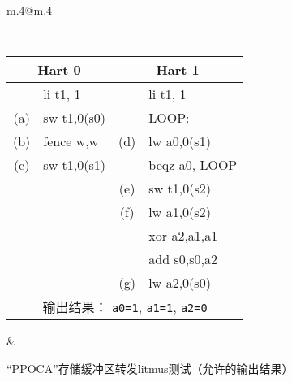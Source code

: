 \begin{figure}[h!]
  \centering
  \begin{tabular}{m{.4\linewidth}@{\qquad}m{.4\linewidth}}
  {
    \tt\small
    \begin{tabular}{cl||cl}
    \multicolumn{2}{c}{Hart 0} & \multicolumn{2}{c}{Hart 1} \\
    \hline
          & li t1, 1    &     & li t1, 1      \\
      (a) & sw t1,0(s0) &     & LOOP:         \\
      (b) & fence w,w   & (d) & lw a0,0(s1)   \\
      (c) & sw t1,0(s1) &     & beqz a0, LOOP \\
          &             & (e) & sw t1,0(s2)   \\
          &             & (f) & lw a1,0(s2)   \\
          &             &     & xor a2,a1,a1  \\
          &             &     & add s0,s0,a2  \\
          &             & (g) & lw a2,0(s0)   \\
      \hline
      \multicolumn{4}{c}{输出结果： {\tt a0=1}, {\tt a1=1}, {\tt a2=0}}
    \end{tabular}
  }
  &
  
  \end{tabular}
  \caption{“PPOCA”存储缓冲区转发litmus测试（允许的输出结果）}
  \label{fig:litmus:ppoca}
\end{figure}

